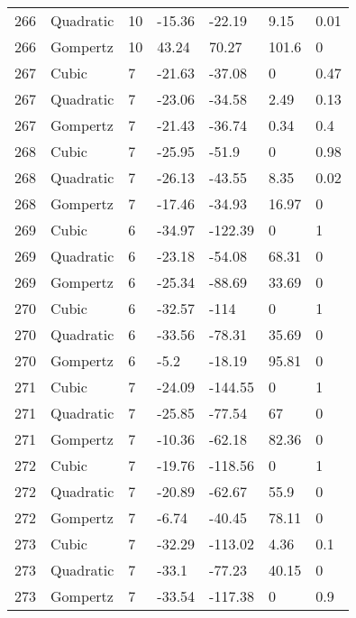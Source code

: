 \documentclass[11pt]{article}
\begin{document}
\begin{center}
\begin{longtable}{lllllll}
    266 & Quadratic & 10              & -15.36  & -22.19  & 9.15    & 0.01 \\
    266 & Gompertz  & 10              & 43.24   & 70.27   & 101.6   & 0    \\
    267 & Cubic     & 7               & -21.63  & -37.08  & 0       & 0.47 \\
    267 & Quadratic & 7               & -23.06  & -34.58  & 2.49    & 0.13 \\
    267 & Gompertz  & 7               & -21.43  & -36.74  & 0.34    & 0.4  \\
    268 & Cubic     & 7               & -25.95  & -51.9   & 0       & 0.98 \\
    268 & Quadratic & 7               & -26.13  & -43.55  & 8.35    & 0.02 \\
    268 & Gompertz  & 7               & -17.46  & -34.93  & 16.97   & 0    \\
    269 & Cubic     & 6               & -34.97  & -122.39 & 0       & 1    \\
    269 & Quadratic & 6               & -23.18  & -54.08  & 68.31   & 0    \\
    269 & Gompertz  & 6               & -25.34  & -88.69  & 33.69   & 0    \\
    270 & Cubic     & 6               & -32.57  & -114    & 0       & 1    \\
    270 & Quadratic & 6               & -33.56  & -78.31  & 35.69   & 0    \\
    270 & Gompertz  & 6               & -5.2    & -18.19  & 95.81   & 0    \\
    271 & Cubic     & 7               & -24.09  & -144.55 & 0       & 1    \\
    271 & Quadratic & 7               & -25.85  & -77.54  & 67      & 0    \\
    271 & Gompertz  & 7               & -10.36  & -62.18  & 82.36   & 0    \\
    272 & Cubic     & 7               & -19.76  & -118.56 & 0       & 1    \\
    272 & Quadratic & 7               & -20.89  & -62.67  & 55.9    & 0    \\
    272 & Gompertz  & 7               & -6.74   & -40.45  & 78.11   & 0    \\
    273 & Cubic     & 7               & -32.29  & -113.02 & 4.36    & 0.1  \\
    273 & Quadratic & 7               & -33.1   & -77.23  & 40.15   & 0    \\
    273 & Gompertz  & 7               & -33.54  & -117.38 & 0       & 0.9  \\

\end{longtable}
\end{center}
\end{document}
